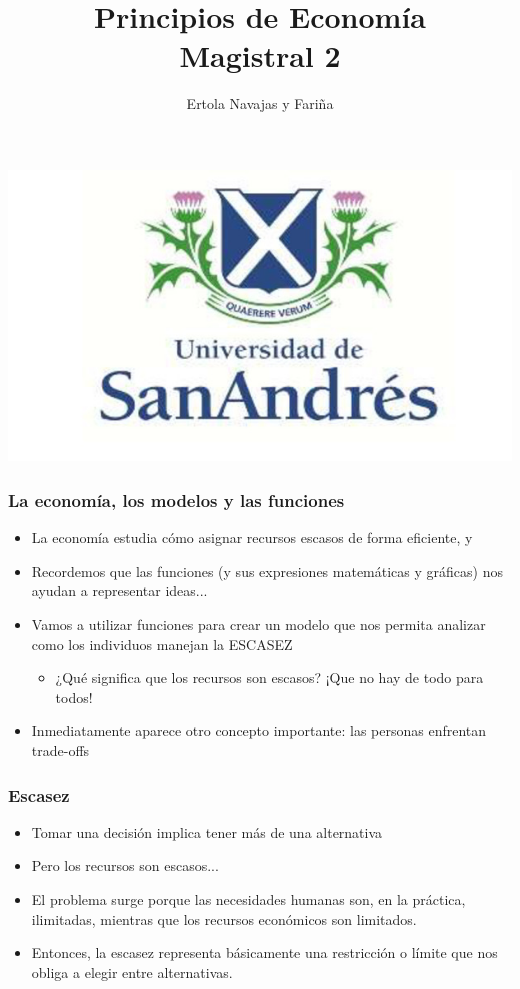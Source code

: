 \documentclass{beamer}
\title[Principios de Economía]{Principios de Economía \vspace{4mm}
\\ Magistral 2}
\date{}
\author[Ertola Navajas y Fariña]{Ertola Navajas y Fariña}
\institute[]{Universidad de San Andrés}
\begin{document}
\begin{frame}
\titlepage
\centering
\includegraphics[scale=0.2]{Slides Principios de Economia/Figures/logoUDESA.jpg} 
\end{frame}


\begin{frame}
\frametitle{La economía, los modelos y las funciones}
\begin{itemize}
    \item La economía estudia cómo asignar recursos escasos de forma eficiente, y \vspace{2mm}
    \item Recordemos que las funciones (y sus expresiones matemáticas y gráficas) nos ayudan a representar ideas... \vspace{2mm}
    \item Vamos a utilizar funciones para crear un modelo que nos permita analizar como los individuos manejan la ESCASEZ 
    \begin{itemize}
        \item ¿Qué significa que los recursos son escasos? ¡Que no hay de todo para todos! 
    \end{itemize}
    \item Inmediatamente aparece otro concepto importante: las personas enfrentan trade-offs
\end{itemize} 
\end{frame}

\begin{frame}
\frametitle{Escasez}
\begin{itemize}
    \item Tomar una decisión implica tener más de una alternativa \vspace{2mm}
    \item Pero los recursos son escasos...  
    \item El problema surge porque las necesidades humanas son, en la práctica, ilimitadas, mientras que los recursos económicos son limitados. 
    \item Entonces, la escasez representa básicamente una restricción o límite que nos obliga a elegir entre alternativas.
    \vspace{2mm}
\end{itemize} 
\end{frame}
\end{document}
